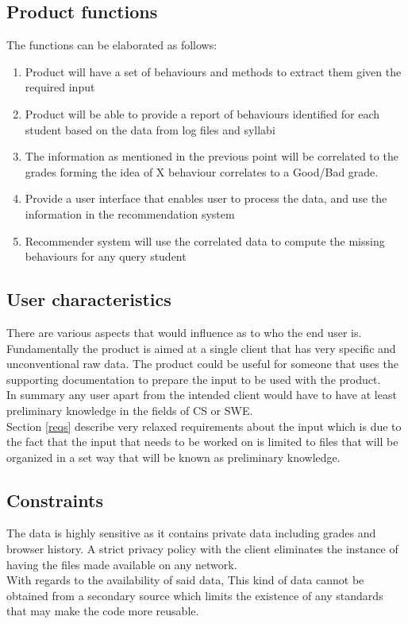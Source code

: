 \documentclass[12pt]{article}
\begin{document}
	\subsection{Product functions}
	The functions can be elaborated as follows:
	\begin{enumerate}
		\item Product will have a set of behaviours and methods to extract them given the required input
		\item Product will be able to provide a report of behaviours identified for each student based on the data from log files and syllabi
		\item The information as mentioned in the previous point will be correlated to the grades forming the idea of X behaviour correlates to a Good/Bad grade.
		\item Provide a user interface that enables user to process the data, and use the information in the recommendation system
		\item Recommender system will use the correlated data to compute the missing behaviours for any query student
	\end{enumerate}
	\subsection{User characteristics}
	There are various aspects that would influence as to who the end user is. Fundamentally the product is aimed at a single client that has very specific and unconventional raw data. The product could be useful for someone that uses the supporting documentation to prepare the input to be used with the product. \\
	In summary any user apart from the intended client would have to have at least preliminary knowledge in the fields of CS or SWE. \\ 
	Section \ref{reqs} describe very relaxed requirements about the input which is due to the fact that the input that needs to be worked on is limited to files that will be organized in a set way that will be known as preliminary knowledge.
	\subsection{Constraints}
	The data is highly sensitive as it contains private data including grades and browser history. A strict privacy policy with the client eliminates the instance of having the files made available on any network. \\
	With regards to the availability of said data, This kind of data cannot be obtained from a secondary source which limits the existence of any standards that may make the code more reusable.
\end{document}

